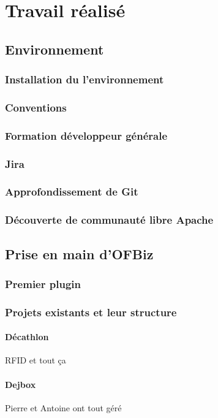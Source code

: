 \chapter{Travail réalisé}

\section{Environnement}

\subsection{Installation du l'environnement}
\subsection{Conventions}
\subsection{Formation développeur générale}
\subsection{Jira}
\subsection{Approfondissement de Git }
\subsection{Découverte de communauté libre Apache}

\section{Prise en main d'OFBiz}

\subsection{Premier plugin}

\subsection{Projets existants et leur structure}
\subsubsection{Décathlon}
RFID et tout ça
\subsubsection{Dejbox}
Pierre et Antoine ont tout géré 

